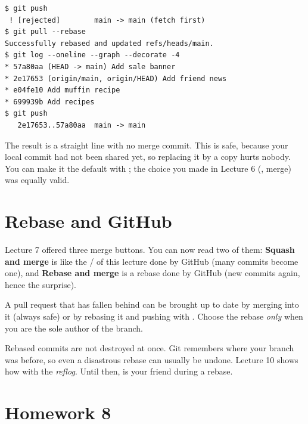 \begin{lstlisting}
$ git push
 ! [rejected]        main -> main (fetch first)
$ git pull --rebase
Successfully rebased and updated refs/heads/main.
$ git log --oneline --graph --decorate -4
* 57a80aa (HEAD -> main) Add sale banner
* 2e17653 (origin/main, origin/HEAD) Add friend news
* e04fe10 Add muffin recipe
* 699939b Add recipes
$ git push
   2e17653..57a80aa  main -> main
\end{lstlisting}

The result is a straight line with no merge commit. This is safe, because your local commit had not been shared yet, so replacing it by a copy hurts nobody. You can make it the default with ; the choice you made in Lecture 6 (, merge) was equally valid.

\section{Rebase and GitHub}

Lecture 7 offered three merge buttons. You can now read two of them: \textbf{Squash and merge} is like the / of this lecture done by GitHub (many commits become one), and \textbf{Rebase and merge} is a rebase done by GitHub (new commits again, hence the  surprise).

A pull request that has fallen behind  can be brought up to date by merging  into it (always safe) or by rebasing it and pushing with . Choose the rebase \emph{only} when you are the sole author of the branch.

\begin{quickfact}
Rebased commits are not destroyed at once. Git remembers where your branch was before, so even a disastrous rebase can usually be undone. Lecture 10 shows how with the \emph{reflog}. Until then,  is your friend during a rebase.
\end{quickfact}

\section{Homework 8}

